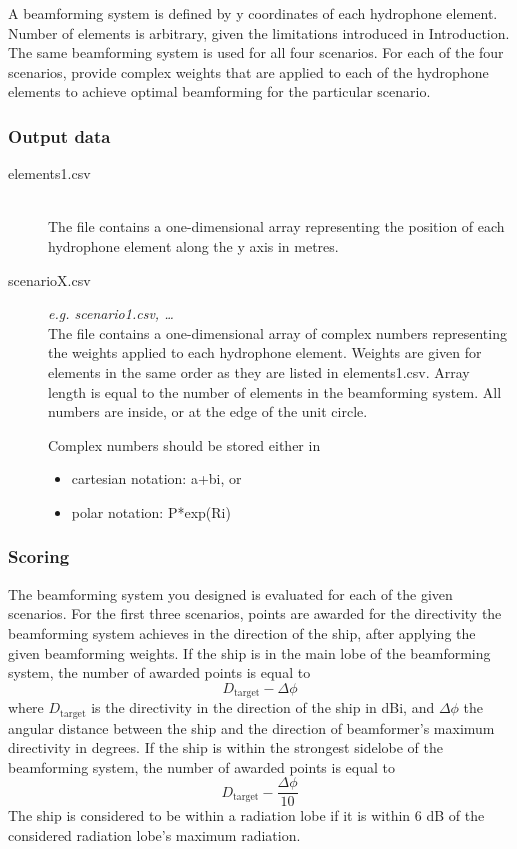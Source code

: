 \documentclass[openany]{book}
\begin{document}
	A beamforming system is defined by y coordinates of each hydrophone 
	element. 
	Number of elements is arbitrary, given the limitations introduced in 
	Introduction. The same beamforming system is used for all four scenarios. 
	For 
	each of the four scenarios, provide complex weights that are applied to 
	each of 
	the hydrophone elements to achieve optimal beamforming for the particular 
	scenario.
	
	\subsubsection*{Output data}
	
	\begin{description}
		\item[elements1.csv] \leavevmode \,\\ The file contains a one-dimensional array 
		representing the position of each hydrophone element along the y axis 
		in 
		metres.
		
		\item[scenarioX.csv] \textit{e.g. scenario1.csv, \ldots}\,\\ The file 
		contains a one-dimensional array of complex numbers representing the 
		weights applied to each hydrophone element. Weights are given for 
		elements 
		in the same order as they are listed in \textsf{elements1.csv}. Array 
		length is equal to the number of elements in the beamforming system. 
		All 
		numbers are inside, or at the edge of the unit circle.
		
		Complex numbers should be stored either in
		\begin{itemize}
			\item cartesian notation: \textsf{a+bi}, or
			\item polar notation: \textsf{P*exp(Ri)}
		\end{itemize}
	\end{description}
	
	
	\subsubsection*{Scoring}
	
	The beamforming system you designed is evaluated for each of the given 
	scenarios. For the first three scenarios, points are awarded for the 
	directivity the beamforming system achieves in the direction of the ship, 
	after 
	applying the given beamforming weights. If the ship is in the main lobe of 
	the 
	beamforming system, the number of awarded points is equal to
	\[ D_\textrm{target} - \varDelta \phi \]
	where $D_\textrm{target}$ is the directivity in the direction of the ship 
	in 
	dBi, and $\varDelta \phi$ the angular distance between the ship and the 
	direction of beamformer's maximum directivity in degrees. If the ship is 
	within 
	the strongest sidelobe of the beamforming system, the number of awarded 
	points 
	is equal to
	\[ D_\textrm{target} - \dfrac{\varDelta \phi}{10} \]
	The ship is considered to be within a radiation lobe if it is within 6 dB 
	of 
	the considered radiation lobe's maximum radiation.
	
\end{document}
